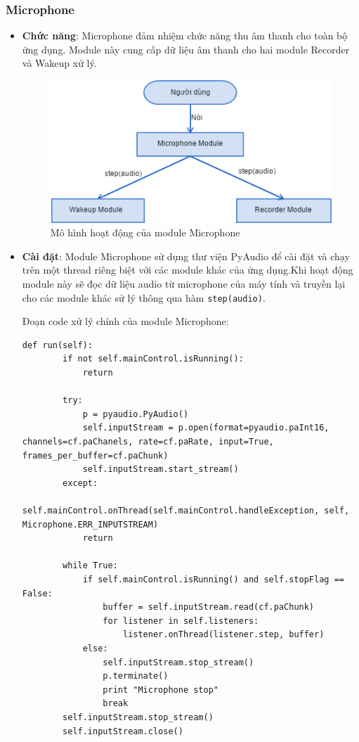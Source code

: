 \subsubsection{Microphone}
\begin{itemize}
\item \textbf{Chức năng}: Microphone đảm nhiệm chức năng thu âm thanh cho toàn bộ ứng dụng. Module này cung cấp dữ liệu âm thanh cho hai module Recorder và Wakeup xử lý.
\begin{figure}[h]
    \centering
    \includegraphics[scale=0.5]{microphone_flowchart}
    \caption{Mô hình hoạt động của module Microphone}
    \label{fig:c6_microphone_flowchart}
\end{figure}

\item \textbf{Cài đặt}: Module Microphone sử dụng thư viện PyAudio để cài đặt và chạy trên một thread riêng biệt với các module khác của ứng dụng.Khi hoạt động module này sẽ đọc dữ liệu audio từ microphone của máy tính và truyền lại cho các module khác sử lý thông qua hàm \lstinline{step(audio)}.

Đoạn code xử lý chính của module Microphone:
\begin{lstlisting}
def run(self):
        if not self.mainControl.isRunning():
            return

        try:
            p = pyaudio.PyAudio()
            self.inputStream = p.open(format=pyaudio.paInt16, channels=cf.paChanels, rate=cf.paRate, input=True, frames_per_buffer=cf.paChunk)
            self.inputStream.start_stream()
        except:
            self.mainControl.onThread(self.mainControl.handleException, self, Microphone.ERR_INPUTSTREAM)
            return

        while True:
            if self.mainControl.isRunning() and self.stopFlag == False:
                buffer = self.inputStream.read(cf.paChunk)
                for listener in self.listeners:
                    listener.onThread(listener.step, buffer) 
            else:
                self.inputStream.stop_stream()
                p.terminate()
                print "Microphone stop"
                break
        self.inputStream.stop_stream()
        self.inputStream.close()
\end{lstlisting}


\end{itemize}
